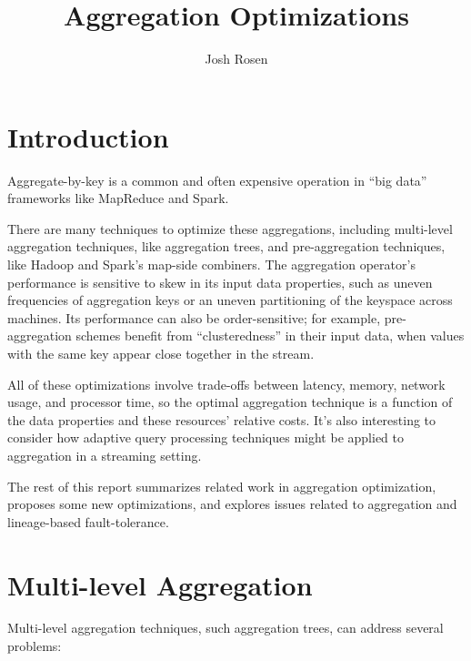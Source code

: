 \documentclass[12pt]{article}
\title{Aggregation Optimizations}
\author{Josh Rosen}
\begin{document}
\maketitle

\section{Introduction}

Aggregate-by-key is a common and often expensive operation in ``big data'' frameworks like MapReduce and Spark.

There are many techniques to optimize these aggregations, including multi-level aggregation techniques, like aggregation trees, and pre-aggregation techniques, like Hadoop and Spark's map-side combiners.
The aggregation operator's performance is sensitive to skew in its input data properties, such as uneven frequencies of aggregation keys or an uneven partitioning of the keyspace across machines.
Its performance can also be order-sensitive; for example, pre-aggregation schemes benefit from ``clusteredness'' in their input data, when values with the same key appear close together in the stream.

All of these optimizations involve trade-offs between latency, memory, network usage, and processor time, so the optimal aggregation technique is a function of the data properties and these resources' relative costs.
It's also interesting to consider how adaptive query processing techniques might be applied to aggregation in a streaming setting.

The rest of this report summarizes related work in aggregation optimization, proposes some new optimizations, and explores issues related to aggregation and lineage-based fault-tolerance.

\section{Multi-level Aggregation}

Multi-level aggregation techniques, such aggregation trees, can address
several problems:
\end{document}
